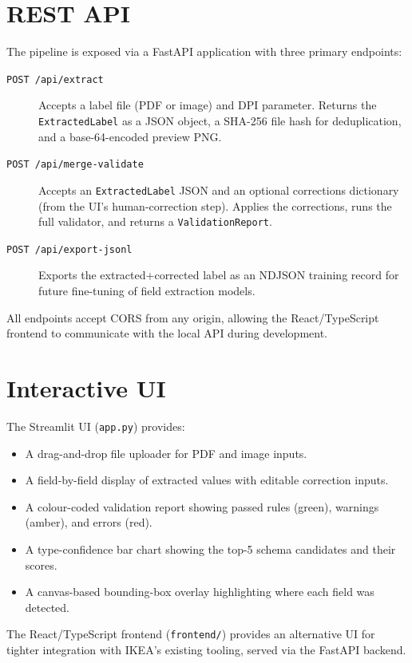 \section{REST API}

The pipeline is exposed via a FastAPI application with three primary endpoints:

\begin{description}
  \item[\texttt{POST /api/extract}] Accepts a label file (PDF or image) and DPI parameter.
  Returns the \texttt{ExtractedLabel} as a JSON object, a SHA-256 file hash for
  deduplication, and a base-64-encoded preview PNG.

  \item[\texttt{POST /api/merge-validate}] Accepts an \texttt{ExtractedLabel} JSON and
  an optional corrections dictionary (from the UI's human-correction step). Applies the
  corrections, runs the full validator, and returns a \texttt{ValidationReport}.

  \item[\texttt{POST /api/export-jsonl}] Exports the extracted+corrected label as an
  NDJSON training record for future fine-tuning of field extraction models.
\end{description}

All endpoints accept CORS from any origin, allowing the React/TypeScript frontend to
communicate with the local API during development.

\section{Interactive UI}

The Streamlit \ac{UI} (\texttt{app.py}) provides:
\begin{itemize}
  \item A drag-and-drop file uploader for PDF and image inputs.
  \item A field-by-field display of extracted values with editable correction inputs.
  \item A colour-coded validation report showing passed rules (green), warnings (amber),
  and errors (red).
  \item A type-confidence bar chart showing the top-5 schema candidates and their scores.
  \item A canvas-based bounding-box overlay highlighting where each field was detected.
\end{itemize}

The React/TypeScript frontend (\texttt{frontend/}) provides an alternative \ac{UI}
for tighter integration with IKEA's existing tooling, served via the FastAPI backend.
